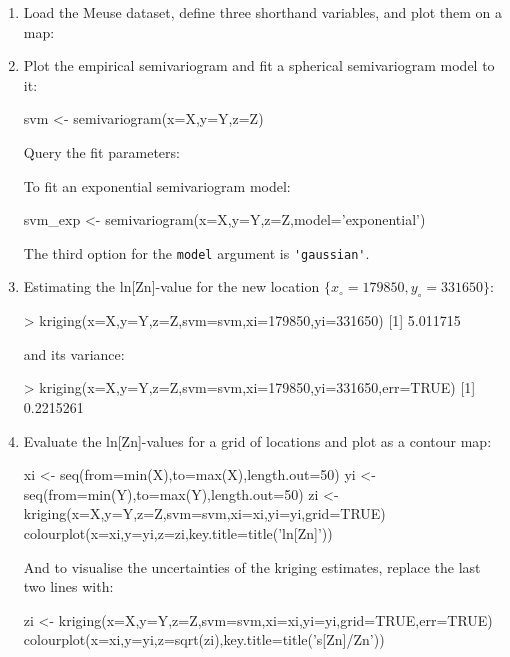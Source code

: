 \begin{enumerate}

\item Load the Meuse dataset, define three shorthand variables, and
  plot them on a map:


\item Plot the empirical semivariogram and fit a spherical
  semivariogram model to it:

\begin{script}[firstnumber=6]
svm <- semivariogram(x=X,y=Y,z=Z)
\end{script}

Query the fit parameters:


To fit an exponential semivariogram model:

\begin{script}[firstnumber=6]
svm_exp <- semivariogram(x=X,y=Y,z=Z,model='exponential')
\end{script}

The third option for the \texttt{model} argument is \verb|'gaussian'|.

\item Estimating the ln[Zn]-value for the new location
  $\{x_,y_\}$:

\begin{console}
> kriging(x=X,y=Y,z=Z,svm=svm,xi=179850,yi=331650)
[1] 5.011715
\end{console}

\noindent and its variance:

\begin{console}
> kriging(x=X,y=Y,z=Z,svm=svm,xi=179850,yi=331650,err=TRUE)
[1] 0.2215261
\end{console}

\item\label{it:R-meuse-contour} Evaluate the ln[Zn]-values for a grid
  of locations and plot as a contour map:

\begin{script}[firstnumber=7]
xi <- seq(from=min(X),to=max(X),length.out=50)
yi <- seq(from=min(Y),to=max(Y),length.out=50)
zi <- kriging(x=X,y=Y,z=Z,svm=svm,xi=xi,yi=yi,grid=TRUE)
colourplot(x=xi,y=yi,z=zi,key.title=title('ln[Zn]'))
\end{script}

And to visualise the uncertainties of the kriging estimates,
replace the last two lines with:

\begin{script}[firstnumber=9]
zi <- kriging(x=X,y=Y,z=Z,svm=svm,xi=xi,yi=yi,grid=TRUE,err=TRUE)
colourplot(x=xi,y=yi,z=sqrt(zi),key.title=title('s[Zn]/Zn'))
\end{script}

\end{enumerate}
